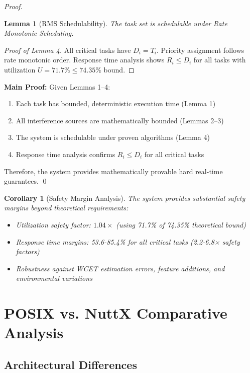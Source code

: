 \documentclass[11pt,a4paper]{article}
\newtheorem{lemma}[theorem]{Lemma}
\newtheorem{corollary}[theorem]{Corollary}
\theoremstyle{definition}
\theoremstyle{remark}
\begin{document}
\begin{proof}
\begin{lemma}[RMS Schedulability]
The task set is schedulable under Rate Monotonic Scheduling.
\end{lemma}

\begin{proof}[Proof of Lemma 4]
All critical tasks have $D_i = T_i$. Priority assignment follows rate monotonic order. Response time analysis shows $R_i \leq D_i$ for all tasks with utilization $U = 71.7\% \leq 74.35\%$ bound.
\end{proof}

\textbf{Main Proof:}
Given Lemmas 1--4:
\begin{enumerate}
    \item Each task has bounded, deterministic execution time (Lemma 1)
    \item All interference sources are mathematically bounded (Lemmas 2--3)
    \item The system is schedulable under proven algorithms (Lemma 4)
    \item Response time analysis confirms $R_i \leq D_i$ for all critical tasks
\end{enumerate}

Therefore, the system provides mathematically provable hard real-time guarantees. \qed
\end{proof}

\begin{corollary}[Safety Margin Analysis]
The system provides substantial safety margins beyond theoretical requirements:
\begin{itemize}
    \item Utilization safety factor: $1.04\times$ (using 71.7\% of 74.35\% theoretical bound)
    \item Response time margins: 53.6-85.4\% for all critical tasks (2.2-6.8× safety factors)
    \item Robustness against WCET estimation errors, feature additions, and environmental variations
\end{itemize}
\end{corollary}

\section{POSIX vs. NuttX Comparative Analysis}

\subsection{Architectural Differences}
\end{document}
